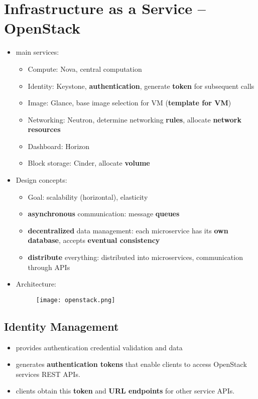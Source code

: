\section{Infrastructure as a Service -- OpenStack}
\begin{itemize}
	\item main services:
	\begin{itemize}
		\item Compute: Nova, central computation
		\item Identity: Keystone, \textbf{authentication}, generate \textbf{token} for subsequent calls
		\item Image: Glance, base image selection for VM (\textbf{template for VM})
		\item Networking: Neutron, determine networking \textbf{rules}, allocate \textbf{network resources}
		\item Dashboard: Horizon
		\item Block storage: Cinder, allocate \textbf{volume}
	\end{itemize}
	\item Design concepts:
	\begin{itemize}
		\item Goal: scalability (horizontal), elasticity
		\item \textbf{asynchronous} communication: message \textbf{queues}
		\item \textbf{decentralized} data management: each microservice has its \textbf{own database}, accepts \textbf{eventual consistency}
		\item \textbf{distribute} everything: distributed into microservices, communication through APIs
	\end{itemize}
	\item Architecture:
	\begin{figure}[H]
		\centering
		\texttt{[image: openstack.png]}
	\end{figure}
\end{itemize}

\subsection{Identity Management}
\begin{itemize}
	\item provides authentication credential validation and data
	\item generates \textbf{authentication tokens} that enable clients to access OpenStack services REST APIs.
	\item clients obtain this \textbf{token} and \textbf{URL endpoints} for other service APIs.
\end{itemize}

